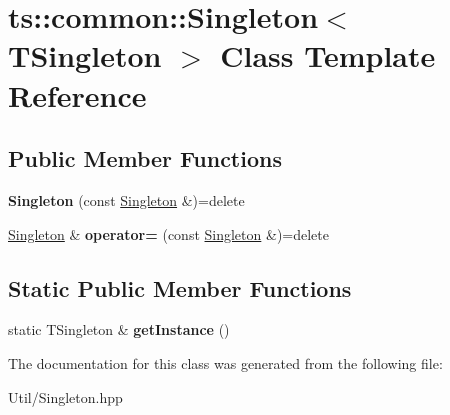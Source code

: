 \hypertarget{classts_1_1common_1_1_singleton}{}\section{ts\+:\+:common\+:\+:Singleton$<$ T\+Singleton $>$ Class Template Reference}
\label{classts_1_1common_1_1_singleton}
\subsection*{Public Member Functions}
\begin{DoxyCompactItemize}
\item 
\mbox{\label{classts_1_1common_1_1_singleton_a9fc0bee78df95f277ef75522f63ffe88}} 
{\bfseries Singleton} (const \hyperlink{classts_1_1common_1_1_singleton}{Singleton} \&)=delete
\item 
\mbox{\label{classts_1_1common_1_1_singleton_aa19d30930875e015900b0223f7fcfcb6}} 
\hyperlink{classts_1_1common_1_1_singleton}{Singleton} \& {\bfseries operator=} (const \hyperlink{classts_1_1common_1_1_singleton}{Singleton} \&)=delete
\end{DoxyCompactItemize}
\subsection*{Static Public Member Functions}
\begin{DoxyCompactItemize}
\item 
\mbox{\label{classts_1_1common_1_1_singleton_a26a67eaeb4671b6c10fec4b3fe50645e}} 
static T\+Singleton \& {\bfseries get\+Instance} ()
\end{DoxyCompactItemize}


The documentation for this class was generated from the following file\+:\begin{DoxyCompactItemize}
\item 
Util/Singleton.\+hpp\end{DoxyCompactItemize}
